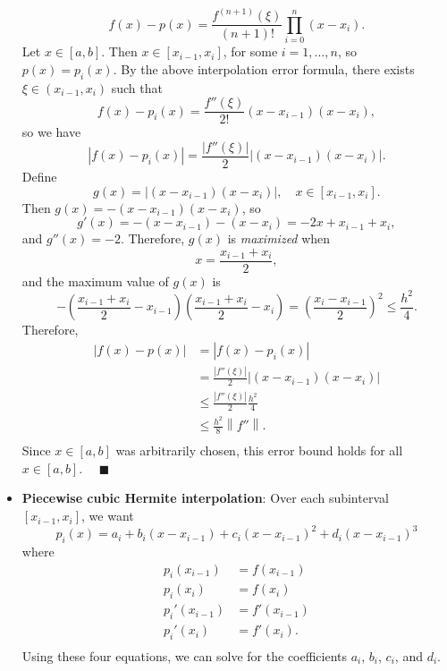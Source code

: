 \documentclass{report}
\begin{document}
\begin{itemize}
            $$f(x) - p(x) = \frac{f^{(n+1)}(\xi)}{(n+1)!} \prod_{i=0}^n (x-x_i).$$
            Let $x \in [a,b]$. Then $x \in [x_{i-1},x_i]$, for some $i=1,\ldots,n$, so $p(x) = p_i(x)$.
            \bigbreak \noindent 
            By the above interpolation error formula, there exists $\xi \in (x_{i-1},x_i)$ such that
            $$f(x) - p_i(x) = \frac{f''(\xi)}{2!} (x-x_{i-1})(x-x_i),$$
            so we have
            $$\left|f(x) - p_i(x)\right| = \frac{\left|f''(\xi)\right|}{2} \left|(x-x_{i-1})(x-x_i)\right|.$$
            \bigbreak \noindent 
            Define 
            $$g(x) = \left|(x-x_{i-1})(x-x_i)\right|, \quad x \in [x_{i-1},x_i].$$
            Then $g(x) = -(x-x_{i-1})(x-x_i)$, so 
            $$g'(x) = -(x-x_{i-1}) - (x-x_i) = -2x + x_{i-1} + x_i,$$ 
            and $g''(x) = -2$. Therefore, $g(x)$ is \textit{maximized} when 
            $$x = \frac{x_{i-1}+x_i}{2},$$
            and the maximum value of $g(x)$ is 
            $$-\left(\frac{x_{i-1}+x_i}{2}-x_{i-1}\right)\left(\frac{x_{i-1}+x_i}{2} -x_i\right) = \left(\frac{x_{i}-x_{i-1}}{2}\right)^2 \leq \frac{h^2}{4}.$$
            Therefore,
            \begin{align*}
                \left|f(x) - p(x)\right| 
&= \left|f(x) - p_i(x)\right| \\
&= \frac{\left|f''(\xi)\right|}{2} \left|(x-x_{i-1})(x-x_i)\right|\\
&\leq \frac{\left|f''(\xi)\right|}{2} \frac{h^2}{4}\\
&\leq \frac{h^2}{8} \left\|f''\right\|. \\
            \end{align*}
            Since $x \in [a,b]$ was arbitrarily chosen, this error bound holds for all $x \in [a,b]$. $\quad \blacksquare$
        \item \textbf{Piecewise cubic Hermite interpolation}:
            Over each subinterval $[x_{i-1}, x_{i}]$, we want
            $$p_i(x) = a_i + b_i(x-x_{i-1}) + c_i(x-x_{i-1})^2 + d_i(x-x_{i-1})^3$$
            where
            \begin{align*}
                p_i(x_{i-1}) &= f(x_{i-1}) \\
                p_i(x_{i}) &= f(x_{i}) \\
                p_i'(x_{i-1}) &= f'(x_{i-1}) \\
                p_i'(x_{i}) &= f'(x_{i}). \\
            \end{align*}
            Using these four equations, we can solve for the coefficients $a_i$, $b_i$, $c_i$, and $d_i$.

\end{itemize}
\end{document}
